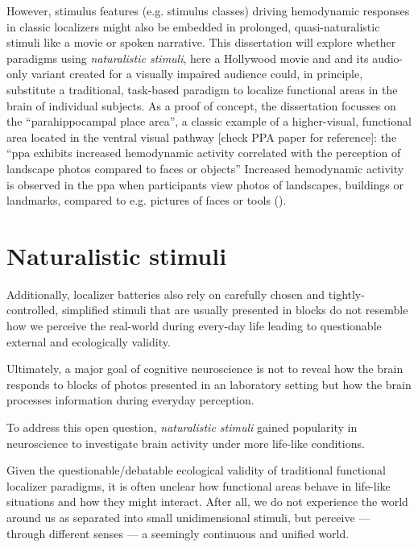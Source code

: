 %
However, stimulus features (e.g. stimulus classes) driving hemodynamic responses
in classic localizers might also be embedded in prolonged, quasi-naturalistic
stimuli like a movie or spoken narrative.
%
This dissertation will explore whether paradigms using \textit{naturalistic
stimuli}, here a Hollywood movie and and its audio-only variant created for a
visually impaired audience could, in principle, substitute a traditional,
task-based paradigm to localize functional areas in the brain of individual
subjects.
%
As a proof of concept, the dissertation focusses on the ``parahippocampal place
area'', a classic example of a higher-visual, functional area
\citep{epstein1998ppa, epstein1999parahippocampal} located in the ventral visual
pathway [check PPA paper for reference]:
the ``\ac{ppa} exhibits increased hemodynamic activity correlated with the
perception of landscape photos compared to faces or objects''
\citep{haeusler2022processing}
Increased hemodynamic activity is observed in the \ac{ppa} when participants
view photos of landscapes, buildings or landmarks, compared to e.g. pictures of
faces or tools (\citep[see reviews][]{epstein2014neural, aminoff2013role}).


\section{Naturalistic stimuli}

Additionally, localizer batteries also rely on carefully chosen and
tightly-controlled, simplified stimuli that are usually presented in blocks do
not resemble how we perceive the real-world during every-day life leading to
questionable external and ecologically validity.

Ultimately, a major goal of cognitive neuroscience is not to reveal how the
brain responds to blocks of photos presented in an laboratory setting but how
the brain processes information during everyday perception.

%
To address this open question, \textit{naturalistic stimuli} gained popularity
in neuroscience to investigate brain activity under more life-like conditions.

%
Given the questionable/debatable ecological validity of traditional functional
localizer paradigms, it is often unclear how functional areas behave in
life-like situations and how they might interact.
%
After all, we do not experience the world around us as separated into small
unidimensional stimuli, but perceive --- through different senses --- a
seemingly continuous and unified world.



